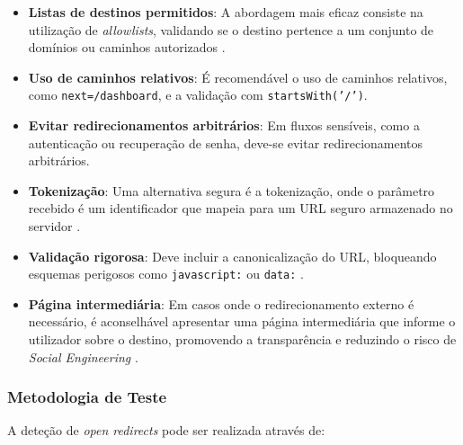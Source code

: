 \begin{itemize}
    \item \textbf{Listas de destinos permitidos}: A abordagem mais eficaz consiste na utilização de \textit{allowlists}, validando se o destino pertence a um conjunto de domínios ou caminhos autorizados \cite{ref45}.
    
    \item \textbf{Uso de caminhos relativos}: É recomendável o uso de caminhos relativos, como \texttt{next=/dashboard}, e a validação com \texttt{startsWith('/')}.
    
    \item \textbf{Evitar redirecionamentos arbitrários}: Em fluxos sensíveis, como a autenticação ou recuperação de senha, deve-se evitar redirecionamentos arbitrários.
    
    \item \textbf{Tokenização}: Uma alternativa segura é a tokenização, onde o parâmetro recebido é um identificador que mapeia para um URL seguro armazenado no servidor \cite{ref43}.
    
    \item \textbf{Validação rigorosa}: Deve incluir a canonicalização do URL, bloqueando esquemas perigosos como \texttt{javascript:} ou \texttt{data:} \cite{ref45}.
    
    \item \textbf{Página intermediária}: Em casos onde o redirecionamento externo é necessário, é aconselhável apresentar uma página intermediária que informe o utilizador sobre o destino, promovendo a transparência e reduzindo o risco de \textit{Social Engineering} \cite{ref44}.
\end{itemize}

\subsubsection{Metodologia de Teste}
\label{subsubsec:metodologia-teste-open-redirects}

A deteção de \textit{open redirects} pode ser realizada através de:

